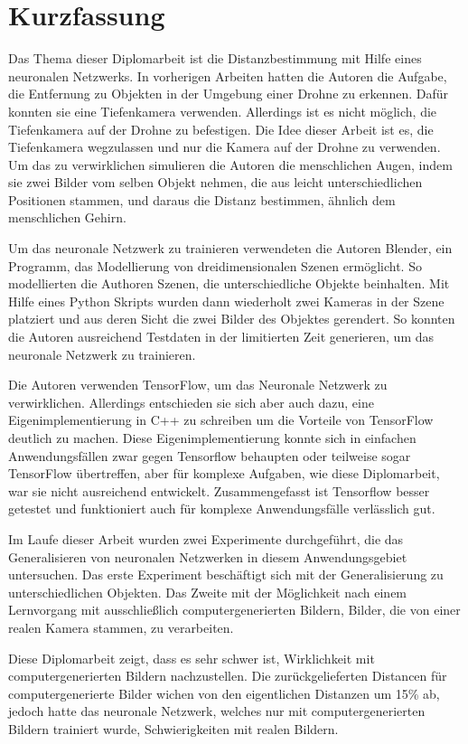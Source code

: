 \chapter{Kurzfassung}

Das Thema dieser Diplomarbeit ist die Distanzbestimmung mit Hilfe eines neuronalen Netzwerks. In vorherigen Arbeiten hatten die Autoren die Aufgabe, die Entfernung zu Objekten in der Umgebung einer Drohne zu erkennen. Dafür konnten sie eine Tiefenkamera verwenden. Allerdings ist es nicht möglich, die Tiefenkamera auf der Drohne zu befestigen. Die Idee dieser Arbeit ist es, die Tiefenkamera wegzulassen und nur die Kamera auf der Drohne zu verwenden. Um das zu verwirklichen simulieren die Autoren die menschlichen Augen, indem sie zwei Bilder vom selben Objekt nehmen, die aus leicht unterschiedlichen Positionen stammen, und daraus die Distanz bestimmen, ähnlich dem menschlichen Gehirn.

Um das neuronale Netzwerk zu trainieren verwendeten die Autoren Blender, ein Programm, das Modellierung von dreidimensionalen Szenen ermöglicht. So modellierten die Authoren Szenen, die unterschiedliche Objekte beinhalten. Mit Hilfe eines Python Skripts wurden dann wiederholt zwei Kameras in der Szene platziert und aus deren Sicht die zwei Bilder des Objektes gerendert. So konnten die Autoren ausreichend Testdaten in der limitierten Zeit generieren, um das neuronale Netzwerk zu trainieren.

Die Autoren verwenden TensorFlow, um das Neuronale Netzwerk zu verwirklichen. Allerdings entschieden sie sich aber auch dazu, eine Eigenimplementierung in C++ zu schreiben um die Vorteile von TensorFlow deutlich zu machen. Diese Eigenimplementierung konnte sich in einfachen Anwendungsfällen zwar gegen Tensorflow behaupten oder teilweise sogar TensorFlow übertreffen, aber für komplexe Aufgaben, wie diese Diplomarbeit, war sie nicht ausreichend entwickelt. Zusammengefasst ist Tensorflow besser getestet und funktioniert auch für komplexe Anwendungsfälle verlässlich gut.

Im Laufe dieser Arbeit wurden zwei Experimente durchgeführt, die das Generalisieren von neuronalen Netzwerken in diesem Anwendungsgebiet untersuchen. Das erste Experiment beschäftigt sich mit der Generalisierung zu unterschiedlichen Objekten. Das Zweite mit der Möglichkeit nach einem Lernvorgang mit ausschließlich computergenerierten Bildern, Bilder, die von einer realen Kamera stammen, zu verarbeiten.

Diese Diplomarbeit zeigt, dass es sehr schwer ist, Wirklichkeit mit computergenerierten Bildern nachzustellen. Die zurückgelieferten Distancen für computergenerierte Bilder wichen von den eigentlichen Distanzen um 15\% ab, jedoch hatte das neuronale Netzwerk, welches nur mit computergenerierten Bildern trainiert wurde, Schwierigkeiten mit realen Bildern.


